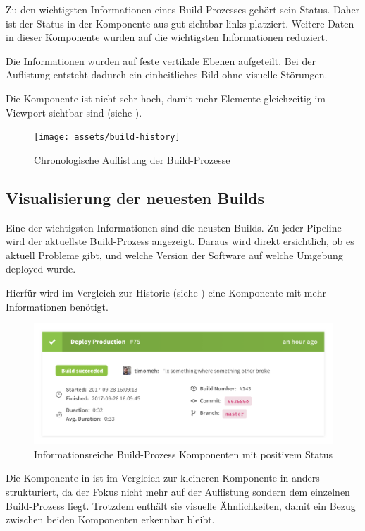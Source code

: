 Zu den wichtigsten Informationen eines Build-Prozesses gehört sein Status. Daher ist der Status in der Komponente aus  gut sichtbar links platziert. Weitere Daten in dieser Komponente wurden auf die wichtigsten Informationen reduziert.

Die Informationen wurden auf feste vertikale Ebenen aufgeteilt. Bei der Auflistung entsteht dadurch ein einheitliches Bild ohne visuelle Störungen.

Die Komponente ist nicht sehr hoch, damit mehr Elemente gleichzeitig im Viewport sichtbar sind (siehe ).

\begin{figure}[H]
  \caption{Chronologische Auflistung der Build-Prozesse}
  \label{fig:build-history}
  \centering
    \texttt{[image: assets/build-history]}
\end{figure}

\subsection{Visualisierung der neuesten Builds}

Eine der wichtigsten Informationen sind die neusten Builds. Zu jeder Pipeline wird der aktuellste Build-Prozess angezeigt. Daraus wird direkt ersichtlich, ob es aktuell Probleme gibt, und welche Version der Software auf welche Umgebung deployed wurde.

Hierfür wird im Vergleich zur Historie (siehe ) eine Komponente mit mehr Informationen benötigt.

\begin{figure}[h]
  \caption{Informationsreiche Build-Prozess Komponenten mit positivem Status}
  \label{fig:build-process-detail}
  \centering
    \includegraphics[width=\textwidth]{assets/build-detail-finished}
\end{figure}

Die Komponente in  ist im Vergleich zur kleineren Komponente in  anders strukturiert, da der Fokus nicht mehr auf der Auflistung sondern dem einzelnen Build-Prozess liegt. Trotzdem enthält sie visuelle Ähnlichkeiten, damit ein Bezug zwischen beiden Komponenten erkennbar bleibt.

